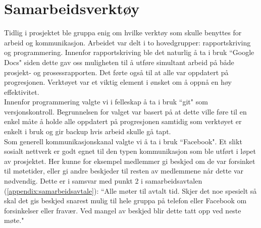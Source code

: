 \section{Samarbeidsverktøy}
Tidlig i prosjektet ble gruppa enig om hvilke verktøy som skulle benyttes for arbeid og kommunikasjon. Arbeidet var delt i to hovedgrupper: rapportskriving og programmering. Innenfor rapportskriving ble det naturlig å ta i bruk ``Google Docs" siden dette gav oss muligheten til å utføre simultant arbeid på både prosjekt- og prosessrapporten. Det førte også til at alle var oppdatert på progresjonen. Verktøyet var et viktig element i ønsket om å oppnå en høy effektivitet.\\

Innenfor programmering valgte vi i felleskap å ta i bruk ``git" som versjonskontroll. Begrunnelsen for valget var basert på at dette ville føre til en enkel måte å holde alle oppdatert på progresjonen samtidig som verktøyet er enkelt i bruk og gir backup hvis arbeid skulle gå tapt.\\

Som generell kommunikasjonskanal valgte vi å ta i bruk ``Facebook". Et slikt sosialt nettverk er godt egnet til den typen kommunikasjon som ble utført i løpet av prosjektet. Her kunne for eksempel medlemmer gi beskjed om de var forsinket til møtetider, eller gi andre beskjeder til resten av medlemmene når dette var nødvendig. Dette er i samsvar med punkt 2 i samarbeidsavtalen (\ref{appendix:samarbeidsavtale}): ``Alle møter til avtalt tid. Skjer det noe spesielt så skal det gis beskjed snarest mulig til hele gruppa på telefon eller Facebook om forsinkelser eller fravær. Ved mangel av beskjed blir dette tatt opp ved neste møte."\\
